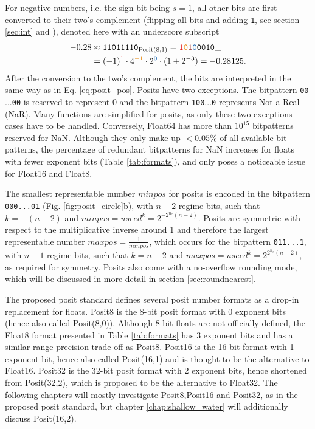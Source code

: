 For negative numbers, i.e. the sign bit being $s=1$, all other bits are first converted to their two's complement (flipping all bits and adding \texttt{1}, 
see section \ref{sec:int} and \cite{Choo2003}), denoted here with an underscore subscript
\begin{equation}
\begin{split}
-0.28 &  \approx \mathtt{11011110}_{\op{Posit}(8,1)} = \mathtt{{\color{psign}1}{\color{pregime}0}{\color{pregimet}1}{\color{pexpo}0}0010}\_ \\
& = (-1)^{\color{psign}1} \cdot 4^{\color{pregime}-1} \cdot 2^{\color{pexpo}0} \cdot (1+2^{-3}) = -0.28125.
\end{split}
\label{eq:2comp}
\end{equation}
After the conversion to the two's complement, the bits are interpreted in the same way as in Eq. \ref{eq:posit_pos}. Posits have two exceptions.
The bitpattern \texttt{00$...$00} is reserved to represent 0 and the bitpattern \texttt{100$...$0} represents Not-a-Real (NaR). Many functions
are simplified for posits, as only these two exceptions cases have to be handled. Conversely, Float64 has more than
$10^{15}$ bitpatterns reserved for NaN. Although they only make up $< 0.05\%$ of all available bit patterns, the percentage of redundant
bitpatterns for NaN increases for floats with fewer exponent bits (Table \ref{tab:formats}), and only poses a noticeable issue for Float16
and Float8.

The smallest representable number $minpos$ for posits is encoded in the bitpattern \texttt{{\color{psign}0}{\color{pregime}00...0}{\color{pregimet}1}}
(Fig. \ref{fig:posit_circle}b), with $n-2$ regime bits, such that $k = -(n-2)$ and $minpos = useed^k = 2^{-2^{n_e}(n-2)}$. Posits are symmetric with respect
to the multiplicative inverse around 1 and therefore the largest representable number $maxpos =  \tfrac{1}{minpos}$, which occurs for 
the bitpattern \texttt{{\color{psign}0}{\color{pregime}11...1}}, with $n-1$ regime bits, such that $k=n-2$ and $maxpos = useed^k = 2^{2^{n_e}(n-2)}$,
as required for symmetry. Posits also come with a no-overflow rounding mode, which will be discussed in more detail
in section \ref{sec:roundnearest}.

The proposed posit standard defines several posit number formats as a drop-in replacement for floats. Posit8 is the 8-bit posit format with 0
exponent bits (hence also called Posit(8,0)). Although 8-bit floats are not officially defined, the Float8 format presented in Table \ref{tab:formats}
has 3 exponent bits and has a similar range-precision trade-off as Posit8. Posit16 is the 16-bit format with 1 exponent bit, hence also called
Posit(16,1) and is thought to be the alternative to Float16. Posit32 is the 32-bit posit format with 2 exponent bits, hence shortened from
Posit(32,2), which is proposed to be the alternative to Float32. The following chapters will mostly investigate Posit8,Posit16 and Posit32,
as in the proposed posit standard, but chapter \ref{chap:shallow_water} will additionally discuss Posit(16,2).

